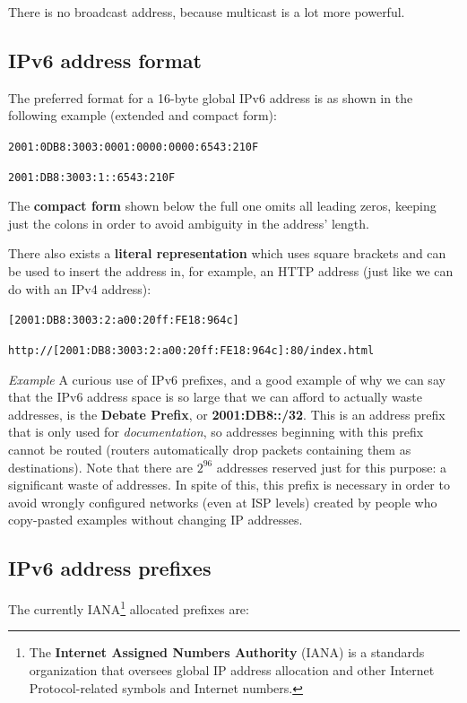 There is no broadcast address, because multicast is a lot more powerful.


\subsection{IPv6 address format}

The preferred format for a 16-byte global IPv6 address is as shown in the following example (extended and compact form):
\begin{center}
    \texttt{2001:0DB8:3003:0001:0000:0000:6543:210F}
    
    \texttt{2001:DB8:3003:1::6543:210F}
\end{center}

The \textbf{compact form} shown below the full one omits all leading zeros, keeping just the colons in order to avoid ambiguity in the address' length.

There also exists a \textbf{literal representation} which uses square brackets and can be used to insert the address in, for example, an HTTP address (just like we can do with an IPv4 address):
\begin{center}
    \texttt{[2001:DB8:3003:2:a00:20ff:FE18:964c]}
    
    \emph{} \texttt{http://[2001:DB8:3003:2:a00:20ff:FE18:964c]:80/index.html}
\end{center}

\emph{Example} A curious use of IPv6 prefixes, and a good example of why we can say that the IPv6 address space is so large that we can afford to actually waste addresses, is the \textbf{Debate Prefix}, or \textbf{2001:DB8::/32}. This is an address prefix that is only used for \textit{documentation}, so addresses beginning with this prefix cannot be routed (routers automatically drop packets containing them as destinations). Note that there are $2^{96}$ addresses reserved just for this purpose: a significant waste of addresses. In spite of this, this prefix is necessary in order to avoid wrongly configured networks (even at ISP levels) created by people who copy-pasted examples without changing IP addresses.


\subsection{IPv6 address prefixes}
The currently IANA\footnote{The \textbf{Internet Assigned Numbers Authority} (IANA) is a standards organization that oversees global IP address allocation and other Internet Protocol-related symbols and Internet numbers.} allocated prefixes are:

